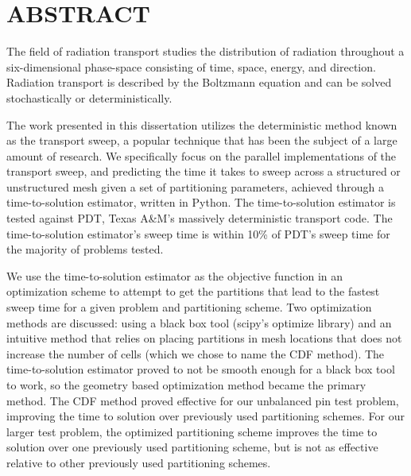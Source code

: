 %
%
%
%

\chapter*{ABSTRACT}

\pagestyle{plain} %
\setcounter{page}{2}

\indent The field of radiation transport studies the distribution of radiation throughout a six-dimensional phase-space consisting of time, space, energy, and direction. Radiation transport is described by the Boltzmann equation and can be solved stochastically or deterministically.

The work presented in this dissertation utilizes the deterministic method known as the transport sweep, a popular technique that has been the subject of a large amount of research.
We specifically focus on the parallel implementations of the transport sweep, and predicting the time it takes to sweep across a structured or unstructured mesh given a set of partitioning parameters, achieved through a time-to-solution estimator, written in Python.
The time-to-solution estimator is tested against PDT, Texas A\&M's massively deterministic transport code.
The time-to-solution estimator's sweep time is within 10\% of PDT's sweep time for the majority of problems tested.

We use the time-to-solution estimator as the objective function in an optimization scheme to attempt to get the partitions that lead to the fastest sweep time for a given problem and partitioning scheme.
Two optimization methods are discussed: using a black box tool (scipy's optimize library) and an intuitive method that relies on placing partitions in mesh locations that does not increase the number of cells (which we chose to name the CDF method).
The time-to-solution estimator proved to not be smooth enough for a black box tool to work, so the geometry based optimization method became the primary method.
The CDF method proved effective for our unbalanced pin test problem, improving the time to solution over previously used partitioning schemes.
For our larger test problem, the optimized partitioning scheme improves the time to solution over one previously used partitioning scheme, but is not as effective relative to other previously used partitioning schemes.
\pagebreak{}
